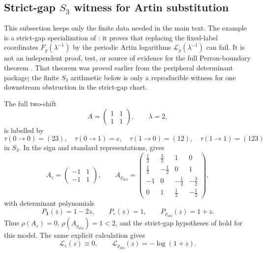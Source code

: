 \subsection{Strict-gap \texorpdfstring{\(S_3\)}{S3} witness for Artin substitution}
\label{subsec:s3-obstruction-certificate}

This subsection keeps only the finite data needed in the main text.  The
example is a strict-gap specialization of
: it proves
that replacing the fixed-label coordinates \(F_\varrho(\lambda^{-1})\) by the
periodic Artin logarithms \(\mathcal L_\varrho(\lambda^{-1})\) can fail.  It is
not an independent proof, test, or source of evidence for the full
Perron-boundary theorem
.  That theorem was proved
earlier from the peripheral determinant package; the finite \(S_3\) arithmetic
below is only a reproducible witness for one downstream obstruction in the
strict-gap chart.

The full two-shift
\[
  A=\begin{pmatrix}1&1\\1&1\end{pmatrix},\qquad \lambda=2,
\]
is labelled by
\begin{equation}\label{eq:s3-main-text-edge-labels}
  \tau(0\to0)=(23),\quad \tau(0\to1)=e,\quad
  \tau(1\to0)=(12),\quad \tau(1\to1)=(123)
\end{equation}
in \(S_3\).  In the sign and standard representations,
 gives
\[
  A_\varepsilon=\begin{pmatrix}-1&1\\-1&1\end{pmatrix},
  \qquad
  A_{\varrho_{\mathrm{std}}}=
  \begin{pmatrix}
    \frac12&\frac32&1&0\\
    \frac12&-\frac12&0&1\\
    -1&0&-\frac12&-\frac32\\
    0&1&\frac12&-\frac12
  \end{pmatrix},
\]
with determinant polynomials
\[
  P_{\mathbf1}(z)=1-2z,\qquad
  P_\varepsilon(z)=1,\qquad
  P_{\varrho_{\mathrm{std}}}(z)=1+z .
\]
Thus \(\rho(A_\varepsilon)=0\),
\(\rho(A_{\varrho_{\mathrm{std}}})=1<2\), and the strict-gap hypotheses of
 hold for
this model.  The same explicit calculation gives
\[
  \mathcal L_\varepsilon(z)\equiv0,\qquad
  \mathcal L_{\varrho_{\mathrm{std}}}(z)=-\log(1+z).
\]

